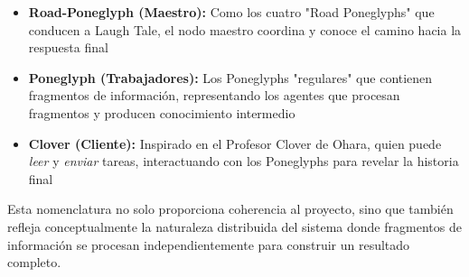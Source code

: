 \begin{itemize}
    \item \textbf{Road-Poneglyph (Maestro):} Como los cuatro "Road Poneglyphs" que conducen a Laugh Tale, el nodo maestro coordina y conoce el camino hacia la respuesta final
    \item \textbf{Poneglyph (Trabajadores):} Los Poneglyphs "regulares" que contienen fragmentos de información, representando los agentes que procesan fragmentos y producen conocimiento intermedio
    \item \textbf{Clover (Cliente):} Inspirado en el Profesor Clover de Ohara, quien puede \emph{leer} y \emph{enviar} tareas, interactuando con los Poneglyphs para revelar la historia final
\end{itemize}

Esta nomenclatura no solo proporciona coherencia al proyecto, sino que también refleja conceptualmente la naturaleza distribuida del sistema donde fragmentos de información se procesan independientemente para construir un resultado completo.
